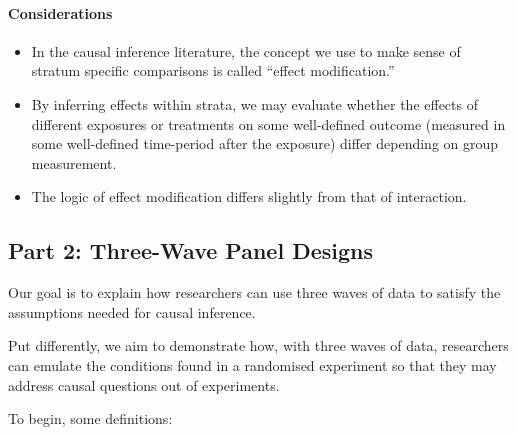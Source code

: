 \documentclass[
  singlecolumn]{article}
\let\oldparagraph\paragraph
\renewcommand{\paragraph}[1]{\oldparagraph{#1}\mbox{}}
\providecommand{\tightlist}{%
  \setlength{\itemsep}{0pt}\setlength{\parskip}{0pt}}\usepackage{longtable,booktabs,array}
\begin{document}
\paragraph{Considerations}\label{considerations}

\begin{itemize}
\tightlist
\item
  In the causal inference literature, the concept we use to make sense
  of stratum specific comparisons is called ``effect modification.''
\item
  By inferring effects within strata, we may evaluate whether the
  effects of different exposures or treatments on some well-defined
  outcome (measured in some well-defined time-period after the exposure)
  differ depending on group measurement.
\item
  The logic of effect modification differs slightly from that of
  interaction.
\end{itemize}

\subsection{Part 2: Three-Wave Panel
Designs}\label{part-2-three-wave-panel-designs}

Our goal is to explain how researchers can use three waves of data to
satisfy the assumptions needed for causal inference.

Put differently, we aim to demonstrate how, with three waves of data,
researchers can emulate the conditions found in a randomised experiment
so that they may address causal questions out of experiments.

To begin, some definitions:
\end{document}
